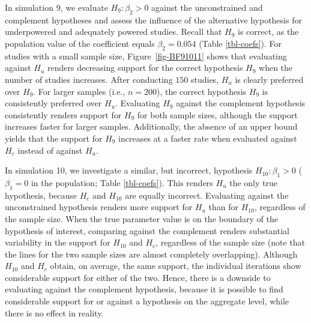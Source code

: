 \documentclass[
]{interact}
\begin{document}
In simulation 9, we evaluate \(H_9: \beta_2 > 0\) against the
unconstrained and complement hypotheses and assess the influence of the
alternative hypothesis for underpowered and adequately powered studies.
Recall that \(H_9\) is correct, as the population value of the
coefficient equals \(\beta_2 = 0.054\) (Table \ref{tbl-coefs}). For
studies with a small sample size, Figure~\ref{fig-BF91011} shows that
evaluating against \(H_u\) renders decreasing support for the correct
hypothesis \(H_9\) when the number of studies increases. After
conducting \(150\) studies, \(H_u\) is clearly preferred over \(H_9\).
For larger samples (i.e., \(n = 200\)), the correct hypothesis \(H_9\)
is consistently preferred over \(H_u\). Evaluating \(H_9\) against the
complement hypothesis consistently renders support for \(H_9\) for both
sample sizes, although the support increases faster for larger samples.
Additionally, the absence of an upper bound yields that the support for
\(H_9\) increases at a faster rate when evaluated against \(H_c\)
instead of against \(H_u\).

In simulation 10, we investigate a similar, but incorrect, hypothesis
\(H_{10}: \beta_1 > 0\) (\(\beta_{1}=0\) in the population; Table
\ref{tbl-coefs}). This renders \(H_u\) the only true hypothesis, because
\(H_c\) and \(H_{10}\) are equally incorrect. Evaluating against the
unconstrained hypothesis renders more support for \(H_u\) than for
\(H_{10}\), regardless of the sample size. When the true parameter value
is on the boundary of the hypothesis of interest, comparing against the
complement renders substantial variability in the support for \(H_{10}\)
and \(H_c\), regardless of the sample size (note that the lines for the
two sample sizes are almost completely overlapping). Although \(H_{10}\)
and \(H_c\) obtain, on average, the same support, the individual
iterations show considerable support for either of the two. Hence, there
is a downside to evaluating against the complement hypothesis, because
it is possible to find considerable support for or against a hypothesis
on the aggregate level, while there is no effect in reality.
\end{document}
